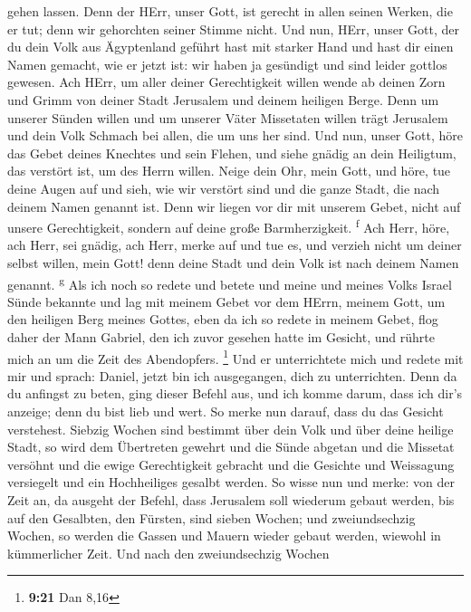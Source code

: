 gehen lassen. Denn der HErr, unser Gott, ist gerecht in allen seinen
Werken, die er tut; denn wir gehorchten seiner Stimme nicht.
 Und nun, HErr, unser Gott, der du dein Volk aus
Ägyptenland geführt hast mit starker Hand und hast dir einen Namen
gemacht, wie er jetzt ist: wir haben ja gesündigt und sind leider
gottlos gewesen.  Ach HErr, um aller deiner Gerechtigkeit
willen wende ab deinen Zorn und Grimm von deiner Stadt Jerusalem und
deinem heiligen Berge. Denn um unserer Sünden willen und um unserer
Väter Missetaten willen trägt Jerusalem und dein Volk Schmach bei allen,
die um uns her sind.  Und nun, unser Gott, höre das Gebet
deines Knechtes und sein Flehen, und siehe gnädig an dein Heiligtum, das
verstört ist, um des Herrn willen.  Neige dein Ohr, mein
Gott, und höre, tue deine Augen auf und sieh, wie wir verstört sind und
die ganze Stadt, die nach deinem Namen genannt ist. Denn wir liegen vor
dir mit unserem Gebet, nicht auf unsere Gerechtigkeit, sondern auf deine
große Barmherzigkeit. \textsuperscript{f}  Ach Herr,
höre, ach Herr, sei gnädig, ach Herr, merke auf und tue es, und verzieh
nicht um deiner selbst willen, mein Gott! denn deine Stadt und dein Volk
ist nach deinem Namen genannt. \textsuperscript{g}  Als
ich noch so redete und betete und meine und meines Volks Israel Sünde
bekannte und lag mit meinem Gebet vor dem HErrn, meinem Gott, um den
heiligen Berg meines Gottes,  eben da ich so redete in
meinem Gebet, flog daher der Mann Gabriel, den ich zuvor gesehen hatte
im Gesicht, und rührte mich an um die Zeit des Abendopfers. \footnote{\textbf{9:21}
  Dan 8,16}  Und er unterrichtete mich und redete mit mir
und sprach: Daniel, jetzt bin ich ausgegangen, dich zu unterrichten.
 Denn da du anfingst zu beten, ging dieser Befehl aus,
und ich komme darum, dass ich dir's anzeige; denn du bist lieb und wert.
So merke nun darauf, dass du das Gesicht verstehest. 
Siebzig Wochen sind bestimmt über dein Volk und über deine heilige
Stadt, so wird dem Übertreten gewehrt und die Sünde abgetan und die
Missetat versöhnt und die ewige Gerechtigkeit gebracht und die Gesichte
und Weissagung versiegelt und ein Hochheiliges gesalbt werden.
 So wisse nun und merke: von der Zeit an, da ausgeht der
Befehl, dass Jerusalem soll wiederum gebaut werden, bis auf den
Gesalbten, den Fürsten, sind sieben Wochen; und zweiundsechzig Wochen,
so werden die Gassen und Mauern wieder gebaut werden, wiewohl in
kümmerlicher Zeit.  Und nach den zweiundsechzig Wochen
